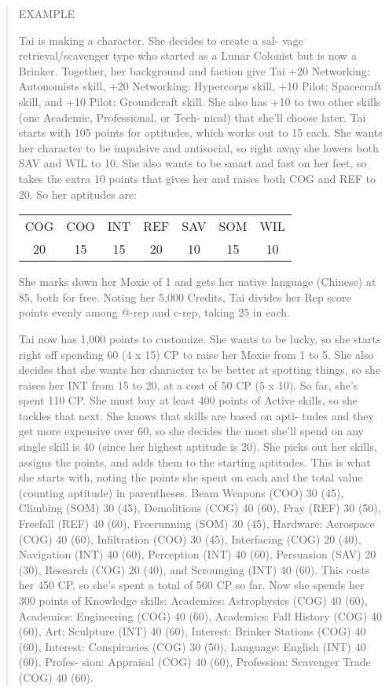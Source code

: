 \begin{quotation}
EXAMPLE

       Tai is making a character. She decides to create a sal-
       vage retrieval/scavenger type who started as a Lunar
       Colonist but is now a Brinker. Together, her background
       and faction give Tai +20 Networking: Autonomists skill,
       +20 Networking: Hypercorps skill, +10 Pilot: Spacecraft
       skill, and +10 Pilot: Groundcraft skill. She also has +10
       to two other skills (one Academic, Professional, or Tech-
       nical) that she’ll choose later.
       Tai starts with 105 points for aptitudes, which works
       out to 15 each. She wants her character to be impulsive
       and antisocial, so right away she lowers both SAV and WIL to 10. She also wants to be smart and fast on her
 feet, so takes the extra 10 points that gives her and
 raises both COG and REF to 20. So her aptitudes are:
 
 \begin{tabular}{ccccccc}
COG & COO & INT & REF & SAV & SOM & WIL \\ 
20 & 15 & 15 & 20 & 10 & 15 & 10 \\ 
\end{tabular} 

 She marks down her Moxie of 1 and gets her native
 language (Chinese) at 85, both for free.
 Noting her 5,000 Credits, Tai divides her Rep score
 points evenly among @-rep and c-rep, taking 25 in each.


Tai now has 1,000 points to customize. She wants to be
lucky, so she starts right off spending 60 (4 x 15) CP to
raise her Moxie from 1 to 5. She also decides that she
wants her character to be better at spotting things, so
she raises her INT from 15 to 20, at a cost of 50 CP (5 x
10). So far, she’s spent 110 CP.
   She must buy at least 400 points of Active skills, so she
tackles that next. She knows that skills are based on apti-
tudes and they get more expensive over 60, so she decides
the most she’ll spend on any single skill is 40 (since her
highest aptitude is 20). She picks out her skills, assigns the
points, and adds them to the starting aptitudes.
   This is what she starts with, noting the points she
spent on each and the total value (counting aptitude)
in parentheses.
   Beam Weapons (COO) 30 (45), Climbing (SOM) 30
(45), Demolitions (COG) 40 (60), Fray (REF) 30 (50),
Freefall (REF) 40 (60), Freerunning (SOM) 30 (45),
Hardware: Aerospace (COG) 40 (60), Infiltration (COO)
30 (45), Interfacing (COG) 20 (40), Navigation (INT) 40
(60), Perception (INT) 40 (60), Persuasion (SAV) 20 (30),
Research (COG) 20 (40), and Scrounging (INT) 40 (60).
   This costs her 450 CP, so she’s spent a total of 560
CP so far.
   Now she spends her 300 points of Knowledge skills:
   Academics: Astrophysics (COG) 40 (60), Academics:
Engineering (COG) 40 (60), Academics: Fall History
(COG) 40 (60), Art: Sculpture (INT) 40 (60), Interest:
Brinker Stations (COG) 40 (60), Interest: Conspiracies
(COG) 30 (50), Language: English (INT) 40 (60), Profes-
sion: Appraisal (COG) 40 (60), Profession: Scavenger
Trade (COG) 40 (60).


\end{quotation}
